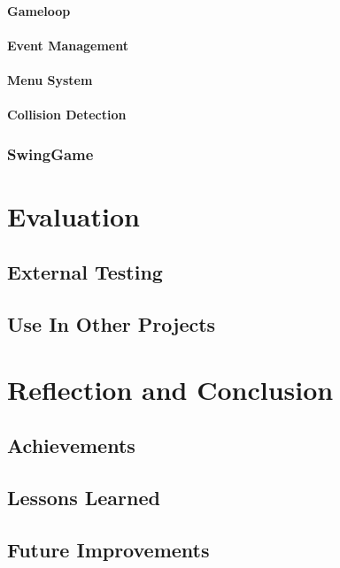 \documentclass[]{report}
\begin{document}
			\subsubsection{Gameloop}
			\subsubsection{Event Management}
			\subsubsection{Menu System}
			\subsubsection{Collision Detection}
		\subsection{SwingGame}
	

\chapter{Evaluation}
	\section{External Testing}
	\section{Use In Other Projects}
	

\chapter{Reflection and Conclusion}
	\section{Achievements}
	\section{Lessons Learned}
	\section{Future Improvements}
	



\end{document}
